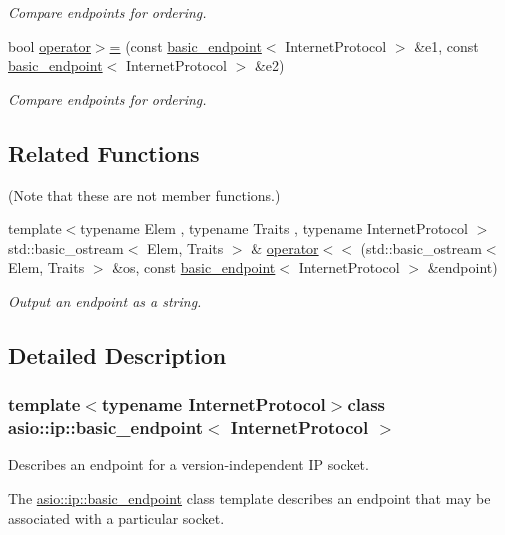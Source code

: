 \begin{DoxyCompactItemize}
\begin{DoxyCompactList}\small\item\em Compare endpoints for ordering. \end{DoxyCompactList}\item 
bool \hyperlink{classasio_1_1ip_1_1basic__endpoint_a034a555a53986acfd0751252ad91e3d1}{operator$>$=} (const \hyperlink{classasio_1_1ip_1_1basic__endpoint}{basic\+\_\+endpoint}$<$ Internet\+Protocol $>$ \&e1, const \hyperlink{classasio_1_1ip_1_1basic__endpoint}{basic\+\_\+endpoint}$<$ Internet\+Protocol $>$ \&e2)
\begin{DoxyCompactList}\small\item\em Compare endpoints for ordering. \end{DoxyCompactList}\end{DoxyCompactItemize}
\subsection*{Related Functions}
(Note that these are not member functions.) \begin{DoxyCompactItemize}
\item 
{\footnotesize template$<$typename Elem , typename Traits , typename Internet\+Protocol $>$ }\\std\+::basic\+\_\+ostream$<$ Elem, Traits $>$ \& \hyperlink{classasio_1_1ip_1_1basic__endpoint_ae0522a69d5ac30675902570994c3f029}{operator$<$$<$} (std\+::basic\+\_\+ostream$<$ Elem, Traits $>$ \&os, const \hyperlink{classasio_1_1ip_1_1basic__endpoint}{basic\+\_\+endpoint}$<$ Internet\+Protocol $>$ \&endpoint)
\begin{DoxyCompactList}\small\item\em Output an endpoint as a string. \end{DoxyCompactList}\end{DoxyCompactItemize}


\subsection{Detailed Description}
\subsubsection*{template$<$typename Internet\+Protocol$>$class asio\+::ip\+::basic\+\_\+endpoint$<$ Internet\+Protocol $>$}

Describes an endpoint for a version-\/independent I\+P socket. 

The \hyperlink{classasio_1_1ip_1_1basic__endpoint}{asio\+::ip\+::basic\+\_\+endpoint} class template describes an endpoint that may be associated with a particular socket.

